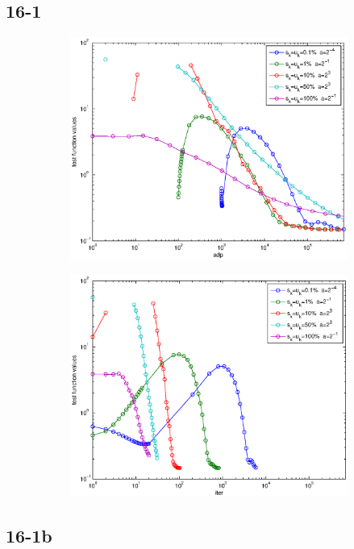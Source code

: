 \documentclass[12pt]{article}
\begin{document}
	
	\subsection{16-1}

	\begin{figure}[H]
	\begin{subfigure}[b]{.5\linewidth}
		        \includegraphics[width=4in]{GenFigures/16-1-1.eps}
	\end{subfigure}%
	\begin{subfigure}[b]{.5\linewidth}
		        \includegraphics[width=4in]{GenFigures/16-1-2.eps}
	\end{subfigure}%

	\end{figure}
	
	\subsection{16-1b}
\end{document}
